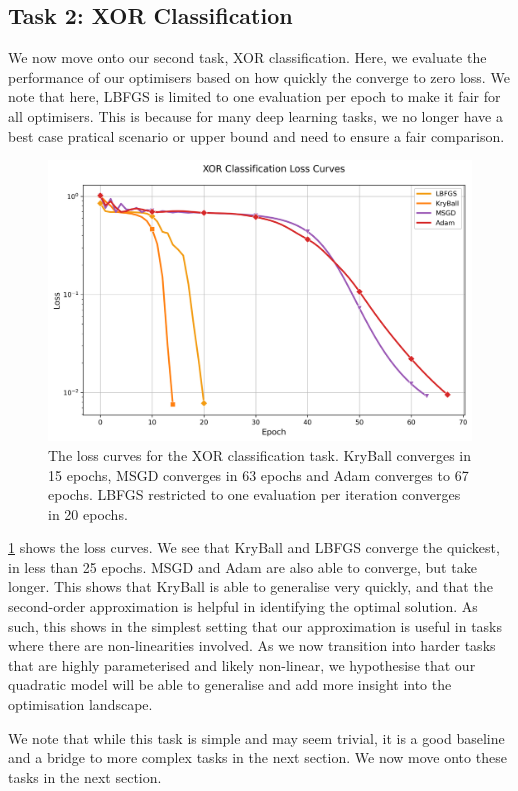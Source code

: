 \subsection{Task 2: XOR Classification}
\label{ssec:results_xor_classification}

We now move onto our second task, XOR classification. Here, we evaluate the performance of our optimisers based on how quickly the converge to zero loss. We note that here, LBFGS is limited to one evaluation per epoch to make it fair for all optimisers. This is because for many deep learning tasks, we no longer have a best case pratical scenario or upper bound and need to ensure a fair comparison.

\begin{figure}[!t]
    \centering
    \includegraphics[width=0.6\linewidth]{figures/5evals/xor_losses.png}
    \caption{The loss curves for the XOR classification task. KryBall converges in 15 epochs, MSGD converges in 63 epochs and Adam converges to 67 epochs. LBFGS restricted to one evaluation per iteration converges in 20 epochs.}
    \label{fig:xor_results}
\end{figure}

\cref{fig:xor_results} shows the loss curves. We see that KryBall and LBFGS converge the quickest, in less than 25 epochs. MSGD and Adam are also able to converge, but take longer. This shows that KryBall is able to generalise very quickly, and that the second-order approximation is helpful in identifying the optimal solution. As such, this shows in the simplest setting that our approximation is useful in tasks where there are non-linearities involved. As we now transition into harder tasks that are highly parameterised and likely non-linear, we hypothesise that our quadratic model will be able to generalise and add more insight into the optimisation landscape.

We note that while this task is simple and may seem trivial, it is a good baseline and a bridge to more complex tasks in the next section. We now move onto these tasks in the next section.

